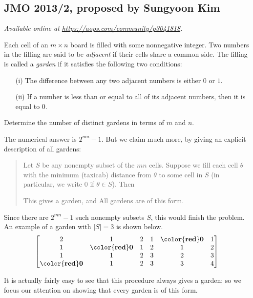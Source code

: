 \documentclass[11pt]{scrartcl}
\begin{document}
\subsection{JMO 2013/2, proposed by Sungyoon Kim}
\textsl{Available online at \url{https://aops.com/community/p3041818}.}
\begin{mdframed}[style=mdpurplebox,frametitle={Problem statement}]
Each cell of an $m\times n$ board is filled with some nonnegative integer.
Two numbers in the filling are said to be
\emph{adjacent} if their cells share a common side.
The filling is called a \emph{garden} if it
satisfies the following two conditions:
\begin{enumerate}
  \item[(i)] The difference between
    any two adjacent numbers is either $0$ or $1$.
  \item[(ii)] If a number is less than or equal to
    all of its adjacent numbers, then it is equal to $0$.
\end{enumerate}
Determine the number of distinct gardens in terms of $m$ and $n$.
\end{mdframed}
The numerical answer is $2^{mn}-1$.
But we claim much more, by giving an explicit description of all gardens:
\begin{quote}
  Let $S$ be any nonempty subset of the $mn$ cells.
  Suppose we fill each cell $\theta$
  with the minimum (taxicab) distance
  from $\theta$ to some cell in $S$
  (in particular, we write $0$ if $\theta \in S$).
  Then
  \begin{itemize}
    \ii This gives a garden, and
    \ii All gardens are of this form.
  \end{itemize}
\end{quote}
Since there are $2^{mn}-1$ such nonempty subsets $S$,
this would finish the problem.
An example of a garden with $|S| = 3$ is shown below.
\[
  \begin{bmatrix}
    2 & 1 & 2 & 1 & \mathbf{\color{red}0} & 1 \\
    1 & \mathbf{\color{red}0} & 1 & 2 & 1 & 2 \\
    1 & 1 & 2 & 3 & 2 & 3 \\
    \mathbf{\color{red}0} & 1 & 2 & 3 & 3 & 4 \\
  \end{bmatrix}
\]

It is actually fairly easy to see that this
procedure always gives a garden;
so we focus our attention on showing that every
garden is of this form.
\end{document}

